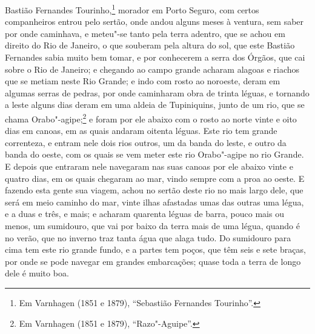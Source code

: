 Bastião Fernandes Tourinho,\footnote{ Em Varnhagen (1851 e 1879), ``Sebastião Fernandes
Tourinho''.} morador em Porto Seguro, com certos companheiros entrou pelo sertão, onde
andou alguns meses à ventura, sem saber por onde caminhava, e meteu"-se tanto pela terra
adentro, que se achou em direito do Rio de Janeiro, o que souberam pela altura do sol, que
este Bastião Fernandes sabia muito bem tomar, e por conhecerem a serra dos Órgãos, que cai
sobre o Rio de Janeiro; e chegando ao campo grande acharam alagoas e riachos que se metiam
neste Rio Grande; e indo com rosto ao noroeste, deram em algumas serras de pedras, por
onde caminharam obra de trinta léguas, e tornando a leste alguns dias deram em uma aldeia
de Tupiniquins, junto de um rio, que se chama Orabo"-agipe;\footnote{ Em Varnhagen (1851 e
1879), ``Razo"-Aguipe''.} e foram por ele abaixo com o rosto ao norte vinte e oito dias em
canoas, em as quais andaram oitenta léguas. Este rio tem grande correnteza, e entram nele
dois rios outros, um da banda do leste, e outro da banda do oeste, com os quais se vem
meter este rio Orabo"-agipe no rio Grande. E depois que entraram nele navegaram nas suas
canoas por ele abaixo vinte e quatro dias, em os quais chegaram ao mar, vindo sempre com a
proa ao oeste. E fazendo esta gente sua viagem, achou no sertão deste rio no mais largo
dele, que será em meio caminho do mar, vinte ilhas afastadas umas das outras uma légua, e
a duas e três, e mais; e acharam quarenta léguas de barra, pouco mais ou menos, um
sumidouro, que vai por baixo da terra mais de uma légua, quando é no verão, que no inverno
traz tanta água que alaga tudo. Do sumidouro para cima tem este rio grande fundo, e a
partes tem poços, que têm seis e sete braças, por onde se pode navegar em grandes
embarcações; quase toda a terra de longo dele é muito boa.

